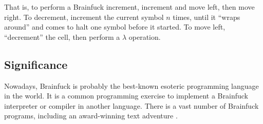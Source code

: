 That is, to perform a Brainfuck increment, increment and move left, then move right. To decrement, increment the current symbol $n$ times, until it “wraps around” and comes to halt one symbol before it started. To move left, “decrement” the cell, then perform a $\lambda$ operation.

\subsection{Significance}

Nowadays, Brainfuck is probably the best-known esoteric programming language in the world. It is a common programming exercise to implement a Brainfuck interpreter or compiler in another language. There is a vast number of Brainfuck programs, including an award-winning text adventure \cite{ripley2005lost}.

%
%
%
%
